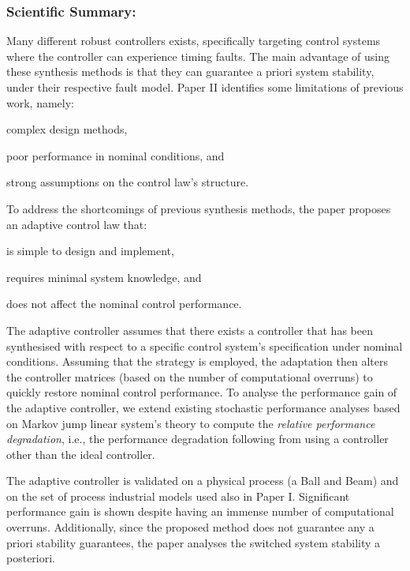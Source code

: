 \subsubsection*{Scientific Summary:}%
%
Many different robust controllers exists, specifically targeting control systems where the controller can experience timing faults.
The main advantage of using these synthesis methods is that they can guarantee a priori system stability, under their respective fault model.
Paper II identifies some limitations of previous work, namely:
\begin{enumerate*}[label=(\roman*)]
    \item complex design methods,
    \item poor performance in nominal conditions, and
    \item strong assumptions on the control law's structure.
\end{enumerate*}

To address the shortcomings of previous synthesis methods, the paper proposes an adaptive control law that:
\begin{enumerate*}[label=(\roman*)]
    \item is simple to design and implement,
    \item requires minimal system knowledge, and
    \item does not affect the nominal control performance.
\end{enumerate*}
The adaptive controller assumes that there exists a controller that has been synthesised with respect to a specific control system's specification under nominal conditions.
Assuming that the \tK{} strategy is employed, the adaptation then alters the controller matrices (based on the number of computational overruns) to quickly restore nominal control performance.
To analyse the performance gain of the adaptive controller, we extend existing stochastic performance analyses based on Markov jump linear system's theory to compute the \emph{relative performance degradation}, i.e., the performance degradation following from using a controller other than the ideal controller.

The adaptive controller is validated on a physical process (a Ball and Beam) and on the set of process industrial models used also in Paper I.
Significant performance gain is shown despite having an immense number of computational overruns.
Additionally, since the proposed method does not guarantee any a priori stability guarantees, the paper analyses the switched system stability a posteriori.

